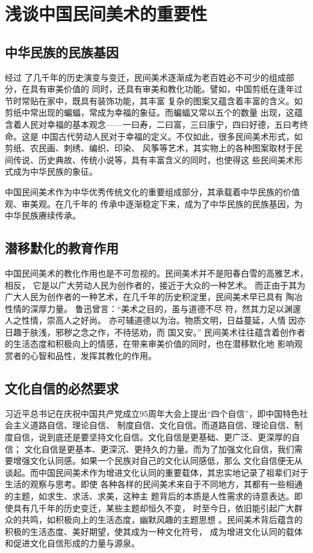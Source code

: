 \section{浅谈中国民间美术的重要性}
\subsection{中华民族的民族基因}
经过
了几千年的历史演变与变迁，民间美术逐渐成为老百姓必不可少的组成部分，在具有审美价值的
同时，还具有审美和教化功能。譬如，中国剪纸在逢年过节时常贴在家中，既具有装饰功能，其丰富
复杂的图案又蕴含着丰富的含义。如剪纸中常出现的蝙蝠，常成为幸福的象征。而蝙蝠又常以五个的数量
出现，这蕴含着人民对幸福的基本观念——一曰寿，二曰富，三曰康宁，四曰好德，五曰考终命。这是
中国古代劳动人民对于幸福的定义。不仅如此，很多民间美术形式，如剪纸、农民画、刺绣、编织、印染、
风筝等艺术，其实物上的各种图案取材于民间传说、历史典故、传统小说等，具有丰富含义的同时，也使得这
些民间美术形式成为中华民族的象征。

中国民间美术作为中华优秀传统文化的重要组成部分，其承载着中华民族的价值观、审美观。在几千年的
传承中逐渐稳定下来，成为了中华民族的民族基因，为中华民族赓续传承。

\subsection{潜移默化的教育作用}
中国民间美术的教化作用也是不可忽视的。民间美术并不是阳春白雪的高雅艺术，相反，
它是以广大劳动人民为创作者的，接近于大众的一种艺术。
而正由于其为广大人民为创作者的一种艺术，在几千年的历史积淀里，民间美术早已具有
陶冶性情的深厚力量。
鲁迅曾言：“美术之目的，虽与道德不尽
符，然其力足以渊邃人之性情，崇高人之好尚。
亦可辅道德以为治。物质文明，日益蔓延，人情
因亦日趣于肤浅，邪秽之念之作，不待惩劝，而
国又安。”
民间美术往往蕴含着创作者的生活态度和积极向上的情感，在带来审美价值的同时，也在潜移默化地
影响观赏者的心智和品性，发挥其教化的作用。

\subsection{文化自信的必然要求}
习近平总书记在庆祝中国共产党成立95周年大会上提出“四个自信”，即中国特色社会主义道路自信、理论自信、
制度自信、文化自信。而道路自信、理论自信、制度自信，说到底还是要坚持文化自信。文化自信是更基础、更广泛、更深厚的自信；
文化自信是更基本、更深沉、更持久的力量。而为了加强文化自信，我们需要增强文化认同感。如果一个民族对自己的文化认同感低，那么
文化自信便无从谈起。而中国民间美术作为增进文化认同的重要载体，其忠实地记录了祖辈们对于生活的观察与思考。即使
各种各样的民间美术来自于不同地方，其都有一些相通的主题，如求生、求活、求美，这种主
题背后的本质是人性需求的诗意表达。即使具有几千年的历史变迁，某些主题却恒久不变，
时至今日，依旧能引起广大群众的共鸣，如积极向上的生活态度，幽默风趣的主题思想
。民间美术背后蕴含的积极的生活态度、美好期望，使其成为一种文化符号，
成为增进文化认同的载体和促进文化自信形成的力量与源泉。
